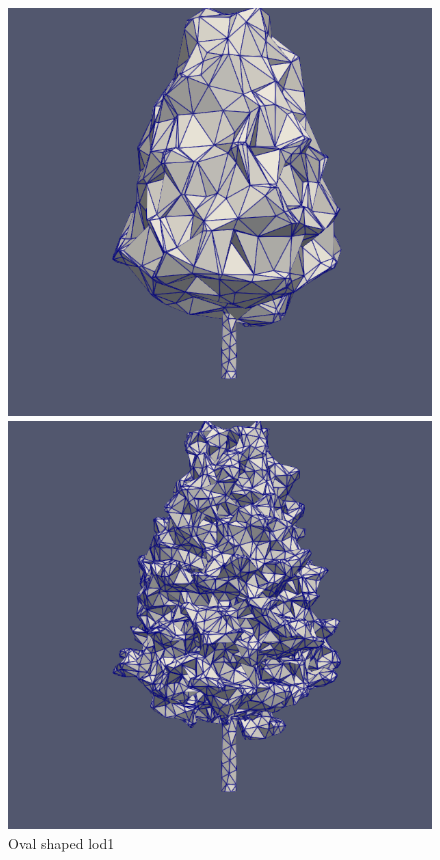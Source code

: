 \documentclass[12pt]{article}
\begin{document}
\begin{figure}[H]
    \centering
    \begin{minipage}{0.30\textwidth}
        \centering
        \includegraphics[width=1\textwidth]{images/tree-oval_lod1.png}
        \caption{Oval shaped lod1}
    \end{minipage}
    \begin{minipage}{0.30\textwidth}
        \centering
        \includegraphics[width=1\textwidth]{images/tree-oval_lod2.png}

\end{minipage}
\end{figure}
\end{document}

